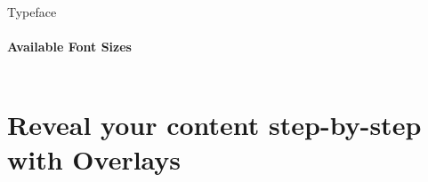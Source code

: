 \documentclass[aspectratio=169]{beamer}
\begin{document}
\begin{frame}{Typeface}
    \framesubtitle{Available Font Sizes}
    \vfill
    \begin{columns}
        \centering
        \thefontsize[TINY]\TINY
        \thefontsize[Tiny]\Tiny
        \thefontsize[myFootnotesize]\myFootnotesize
        \thefontsize[tiny]\tiny
        \thefontsize[scriptsize]\scriptsize
        \thefontsize[footnotesize]\footnotesize
        \thefontsize[small]\small
        \thefontsize[normalsize]\normalsize
        \thefontsize[large]\large
    
        \centering
        \thefontsize[Large]\Large
        \thefontsize[LARGE]\LARGE
        \thefontsize[huge]\huge
        \thefontsize[Huge]\Huge
    \end{columns}
    \vfill
\end{frame}


\section{Reveal your content step-by-step with \textbf{Overlays}}

\begin{frame}
\end{frame}
\end{document}
